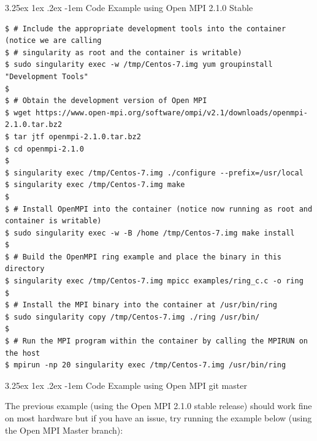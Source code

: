 \documentclass[a4paper]{article}
\makeatletter
\renewcommand\paragraph{\@startsection{paragraph}{5}{\z@}%
  {3.25ex \@plus1ex \@minus.2ex}%
  {-1em}%
  {\normalfont\normalsize\bfseries}}
\makeatother
\begin{document}
\paragraph{Code Example using Open MPI 2.1.0 Stable}\mbox{}\\
\begin{lstlisting}[frame=single]
$ # Include the appropriate development tools into the container (notice we are calling
$ # singularity as root and the container is writable)
$ sudo singularity exec -w /tmp/Centos-7.img yum groupinstall "Development Tools"
$
$ # Obtain the development version of Open MPI
$ wget https://www.open-mpi.org/software/ompi/v2.1/downloads/openmpi-2.1.0.tar.bz2
$ tar jtf openmpi-2.1.0.tar.bz2
$ cd openmpi-2.1.0
$
$ singularity exec /tmp/Centos-7.img ./configure --prefix=/usr/local
$ singularity exec /tmp/Centos-7.img make
$
$ # Install OpenMPI into the container (notice now running as root and container is writable)
$ sudo singularity exec -w -B /home /tmp/Centos-7.img make install
$
$ # Build the OpenMPI ring example and place the binary in this directory
$ singularity exec /tmp/Centos-7.img mpicc examples/ring_c.c -o ring
$
$ # Install the MPI binary into the container at /usr/bin/ring
$ sudo singularity copy /tmp/Centos-7.img ./ring /usr/bin/
$
$ # Run the MPI program within the container by calling the MPIRUN on the host
$ mpirun -np 20 singularity exec /tmp/Centos-7.img /usr/bin/ring

\end{lstlisting}

\paragraph{Code Example using Open MPI git master}

The previous example (using the Open MPI 2.1.0 stable release) should work fine on most hardware but if you have an issue, try running the example below (using the Open MPI Master branch):
\end{document}
